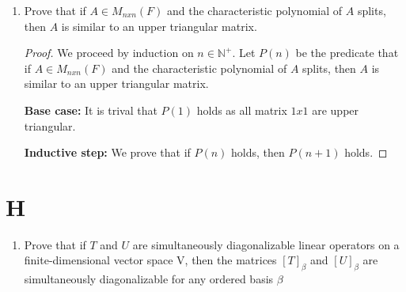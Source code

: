 \documentclass[11pt]{scrartcl}
\begin{document}
\begin{enumerate}[label=\alph*.]
{\begin{proof}
			  \begin{align*}
				\text{det}(A - \lambda I) & = \text{det}(A' - \lambda I_n) \\
				& = \prod_{i=1}^{n}(A'_{i,i} - \lambda)
			\end{align*}
			and $A$ splits as desired. Therefore, analogous result of (a) for matrices holds.
	      \end{proof}
	      }
	\item{
	      Prove that if $A \in M_{nxn}(F)$ and the characteristic polynomial
	      of $A$ splits, then $A$ is similar to an upper triangular matrix.
		  \begin{proof}
			We proceed by induction on $n \in \mathbb{N}^+$.
			Let $P(n)$ be the predicate that if $A \in M_{nxn}(F)$ and the characteristic polynomial
			of $A$ splits, then $A$ is similar to an upper triangular matrix. \par
			\textbf{Base case:} It is trival that $P(1)$ holds as all matrix $1x1$ are upper triangular. \par
			\textbf{Inductive step:} We prove that if $P(n)$ holds, then $P(n + 1)$ holds.
	      \end{proof}
	      }
\end{enumerate}

\section{H}
\begin{enumerate}[label=\alph*.]
	\item{
		Prove that if $T$ and $U$ are simultaneously diagonalizable linear operators on a finite-dimensional vector
		space V, then the matrices $[T]_\beta$ and $[U]_\beta$ are simultaneously diagonalizable for any ordered basis $\beta$
	}
\end{enumerate}



\end{document}
